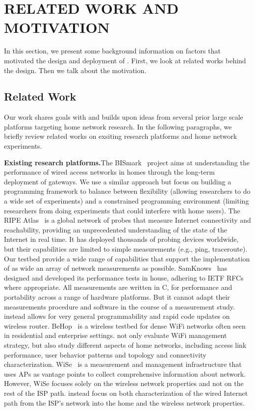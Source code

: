 \chapter{RELATED WORK AND MOTIVATION}
\label{sec.relatedwork_motivation}
In this section, we present some background information on factors that motivated the design and deployment of \sysname. First, we look at related works behind the design. Then we talk about the motivation.
\section{Related Work}
\label{ssec.related_work}
Our work shares goals with and builds upon ideas from several prior large scale platforms targeting home network research. In the following paragraphs, we briefly review related works on exsiting research platforms and home network experiments.  

\textbf{Existing research platforms.}The BISmark~\cite{183951} project aims at understanding the performance of wired access networks in homes through the long-term deployment of gateways. We use a similar approach but focus on building a programming framework to balance between flexibility (allowing researchers to do a wide set of experiments) and a constrained programming environment (limiting researchers from doing experiments that could interfere with home users). The RIPE Atlas~\cite{ripeatlas} is a global network of probes that measure Internet connectivity and reachability, providing an unprecedented understanding of the state of the Internet in real time. It has deployed thousands of probing devices worldwide, but their capabilities are limited to simple measurements (e.g., ping, traceroute). Our testbed provide a wide range of capabilities that support the implementation of as wide an array of network measurements as possible. SamKnows~\cite{samknows} has designed and developed its performance tests in house, adhering to IETF RFCs where appropriate. All measurements are written in C, for performance and portability across a range of hardware platforms. But it cannot adapt their measurements procedure and software in the course of a measurement study. \sysname instead allows for very general programmability and rapid code updates on wireless router. BeHop~\cite{yiakoumis2014behop} is a wireless testbed for dense WiFi networks often seen in residential and enterprise settings. \sysname not only evaluate WiFi management strategy, but also study different aspects of home networks, including access link performance, user behavior patterns and topology and connectivity characterization. WiSe~\cite{patro2013observing} is a measurement and management infrastructure that uses APs as vantage points to collect comprehensive information about network. However, WiSe focuses solely on the wireless network properties and not on the rest of the ISP path. \sysname instead focus on both characterization of the wired Internet path from the ISP’s network into the home and the wireless network properties.

